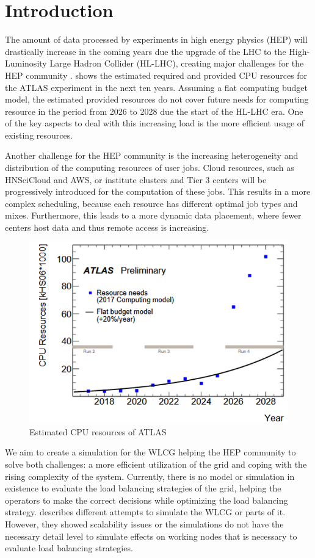 \documentclass{webofc}
\begin{document}
\section{Introduction}
\label{sec:intro}

The amount of data processed by experiments in high energy physics (HEP) will drastically increase in the coming years due the upgrade of the LHC to the High-Luminosity Large Hadron Collider (HL-LHC), creating major challenges for the HEP community \cite{community}.
 shows the estimated required and provided CPU resources for the ATLAS experiment in the next ten years. Assuming a flat computing budget model, the estimated provided resources do not cover future needs for computing resource in the period from 2026 to 2028 due the start of the HL-LHC era. One of the key aspects to deal with this increasing load is the more efficient usage of existing resources.

Another challenge for the HEP community is the increasing heterogeneity and distribution of the computing resources of user jobs. Cloud resources, such as HNSciCloud and AWS, or institute clusters and Tier 3 centers will be progressively introduced for the computation of these jobs. This results in a more complex scheduling, because each resource has different optimal job types and mixes. Furthermore, this leads to a more dynamic data placement, where fewer centers host data and thus remote access is increasing.

\begin{figure}
	\centering
	\includegraphics[width=0.5\linewidth]{images/resources}
	\caption[]{Estimated CPU resources of ATLAS \cite{community}}
	\label{resources}
\end{figure}

We aim to create a simulation for the WLCG helping the HEP community to solve both challenges: a more efficient utilization of the grid and coping with the rising complexity of the system.
Currently, there is no model or simulation in existence to evaluate the load balancing strategies of the grid, helping the operators to make the correct decisions while optimizing the load balancing strategy.
 describes different attempts to simulate the WLCG or parts of it. However, they showed scalability issues or the simulations do not have the necessary detail level to simulate effects on working nodes that is necessary to evaluate load balancing strategies.
\end{document}
